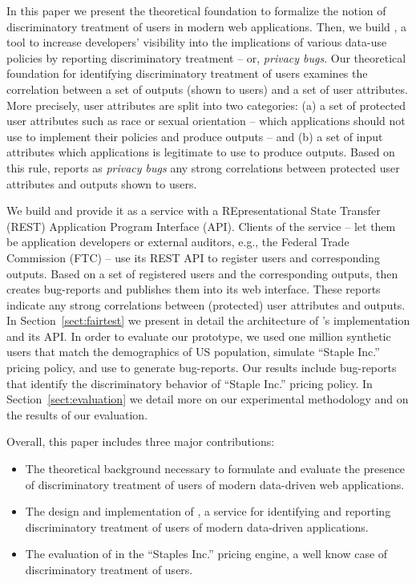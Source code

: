 In this paper we present the theoretical foundation to formalize the notion of
discriminatory treatment of users in modern web applications. Then, we build
\sysname, a tool to increase developers’ visibility into the implications of
various data-use policies by reporting discriminatory treatment -- or,
{\em privacy bugs}. Our theoretical foundation for identifying discriminatory
treatment of users examines the correlation between a set of outputs (shown to
users) and a set of user attributes. More precisely, user attributes are split
into two categories: (a) a set of protected user attributes such as race or
sexual orientation -- which applications should not use to implement their
policies and produce outputs -- and (b) a set of input attributes which
applications is legitimate to use to produce outputs. Based on this rule,
\sysname reports as {\em privacy bugs} any strong correlations between
protected user attributes and outputs shown to users.

We build \sysname and provide it as a service with a REpresentational
State Transfer (REST) Application Program Interface (API). Clients of the 
\sysname service -- let them be application developers or external auditors,
e.g., the Federal Trade Commission (FTC) -- use its REST API to register users
and corresponding outputs. Based on a set of registered users and the
corresponding outputs, \sysname then creates bug-reports and publishes them
into its web interface. These reports indicate any strong correlations between
(protected) user attributes and outputs. In Section~\ref{sect:fairtest} we
present in detail the architecture of \sysname's implementation and its API.
In order to evaluate our \sysname prototype, we used one million synthetic users
that match the demographics of US population, simulate ``Staple Inc.'' pricing
policy, and use \sysname to generate bug-reports. Our results include
bug-reports that identify the discriminatory behavior of ``Staple  Inc.''
pricing policy. In Section~\ref{sect:evaluation} we detail more on our
experimental methodology and on the results of our evaluation.

Overall, this paper includes three major contributions:
\begin{itemize}
  \item The theoretical background necessary to formulate and evaluate the
    presence of discriminatory treatment of users of modern data-driven web
    applications.
  \item The design and implementation of \sysname, a service for identifying
    and reporting discriminatory treatment of users of modern data-driven
    applications.
  \item The evaluation of \sysname in the ``Staples Inc.'' pricing engine, a
    well know case of discriminatory treatment of users.
\end{itemize}

